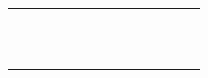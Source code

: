 \begin{landscape}
\begin{longtable}{|c|c|c|c|c|c|c|c|c|c|c|c|}
      &                               &          &         &        &            &                               &      &       &        \\ \hline
      &                               &          &         &        &            &                               &      &       &        \\ \hline
      &                               &          &         &        &            &                               &      &       &        \\ \hline
      &                               &          &         &        &            &                               &      &       &        \\ \hline
      &                               &          &         &        &            &                               &      &       &        \\ \hline
      &                               &          &         &        &            &                               &      &       &        \\ \hline
      &                               &          &         &        &            &                               &      &       &        \\ \hline
      &                               &          &         &        &            &                               &      &       &        \\ \hline
      &                               &          &         &        &            &                               &      &       &        \\ \hline
      &                               &          &         &        &            &                               &      &       &        \\ \hline
      &                               &          &         &        &            &                               &      &       &        \\ \hline
\end{longtable}
\end{landscape}
\clearpage
